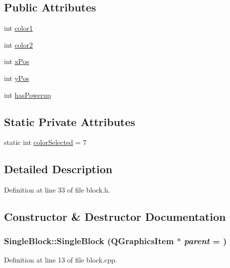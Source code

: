 \subsection*{Public Attributes}
\begin{DoxyCompactItemize}
\item 
int \hyperlink{class_single_block_a750ddf3283bb57511c76688c9465b0c9}{color1}
\item 
int \hyperlink{class_single_block_a7a5875f9554dd6de80abcdaf056d0e28}{color2}
\item 
int \hyperlink{class_single_block_ac542150d68ae2ca631d0bfb6a30ef31b}{xPos}
\item 
int \hyperlink{class_single_block_aa57935921db04eb8d4971a6b1351d4d8}{yPos}
\item 
int \hyperlink{class_single_block_a98b56c58cfbb12b6e7dbcc744d006082}{hasPowerup}
\end{DoxyCompactItemize}
\subsection*{Static Private Attributes}
\begin{DoxyCompactItemize}
\item 
static int \hyperlink{class_single_block_a2982e7fec926fadd304d275ea37f819b}{colorSelected} = 7
\end{DoxyCompactItemize}


\subsection{Detailed Description}


Definition at line 33 of file block.h.

\subsection{Constructor \& Destructor Documentation}
\hypertarget{class_single_block_a7b317497065c067dde1c034ef8f3e0ee}{
\subsubsection[{SingleBlock}]{\setlength{\rightskip}{0pt plus 5cm}SingleBlock::SingleBlock (QGraphicsItem $\ast$ {\em parent} = {})}}
\label{class_single_block_a7b317497065c067dde1c034ef8f3e0ee}


Definition at line 13 of file block.cpp.


